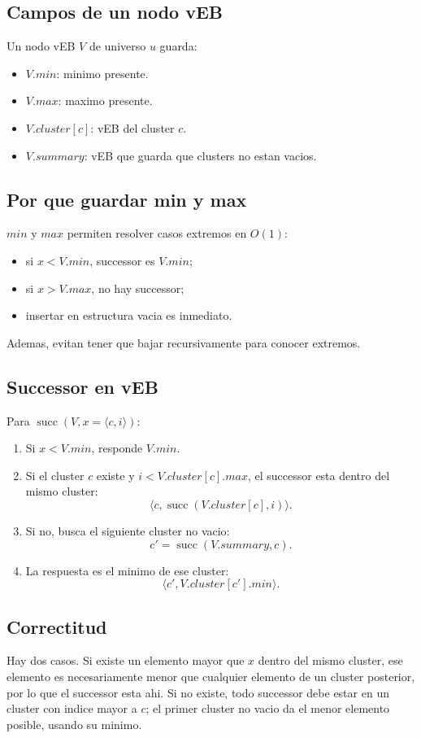 \documentclass[10pt]{article}
\newcommand{\bigO}{O}
\newcommand{\succop}{\operatorname{succ}}
\begin{document}
\subsection{Campos de un nodo vEB}
Un nodo vEB $V$ de universo $u$ guarda:
\begin{itemize}[leftmargin=*]
\item $V.min$: minimo presente.
\item $V.max$: maximo presente.
\item $V.cluster[c]$: vEB del cluster $c$.
\item $V.summary$: vEB que guarda que clusters no estan vacios.
\end{itemize}

\subsection{Por que guardar min y max}
$min$ y $max$ permiten resolver casos extremos en $\bigO(1)$:
\begin{itemize}[leftmargin=*]
\item si $x<V.min$, successor es $V.min$;
\item si $x>V.max$, no hay successor;
\item insertar en estructura vacia es inmediato.
\end{itemize}
Ademas, evitan tener que bajar recursivamente para conocer extremos.

\subsection{Successor en vEB}
Para $\succop(V,x=\langle c,i\rangle)$:
\begin{enumerate}[leftmargin=*]
\item Si $x<V.min$, responde $V.min$.
\item Si el cluster $c$ existe y $i<V.cluster[c].max$, el successor esta dentro
del mismo cluster:
\[
\langle c,\succop(V.cluster[c],i)\rangle.
\]
\item Si no, busca el siguiente cluster no vacio:
\[
c'=\succop(V.summary,c).
\]
\item La respuesta es el minimo de ese cluster:
\[
\langle c',V.cluster[c'].min\rangle.
\]
\end{enumerate}

\subsection{Correctitud}
Hay dos casos. Si existe un elemento mayor que $x$ dentro del mismo cluster, ese
elemento es necesariamente menor que cualquier elemento de un cluster posterior,
por lo que el successor esta ahi. Si no existe, todo successor debe estar en un
cluster con indice mayor a $c$; el primer cluster no vacio da el menor elemento
posible, usando su minimo.
\end{document}
